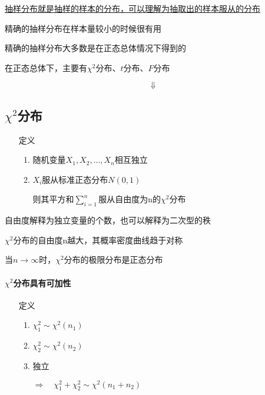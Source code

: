 \documentclass[UTF8,10pt]{book}
\begin{document}
            \underline{抽样分布就是抽样的样本的分布，可以理解为抽取出的样本服从的分布}

            {\kaishu 精确的抽样分布在样本量较小的时候很有用}

            {\kaishu 精确的抽样分布大多数是在正态总体情况下得到的}

            {\kaishu 在正态总体下，主要有$\chi^2$分布、$t$分布、$F$分布}

            $$  \Downarrow $$

        \subsection{$\chi^2$分布}
           
            \begin{itemize}
                \item [定义] {
                    \begin{enumerate}
                        \item 随机变量$X_1,X_2,...,X_n$相互独立
                        \item $X_i$服从标准正态分布$N(0,1)$
                        
                        则其平方和$\sum_{i=1}^n$服从自由度为n的$\chi^2$分布
                    \end{enumerate}
                }
            \end{itemize}
            

            {\kaishu 自由度解释为独立变量的个数，也可以解释为二次型的秩}

            {\kaishu $\chi^2$分布的自由度n越大，其概率密度曲线趋于对称}

            {\kaishu 当$n\to \infty $时，$\chi^2$分布的极限分布是正态分布}

            \paragraph{$\chi^2$分布具有可加性}  
            \begin{itemize}
                \item [定义] {
                    \begin{enumerate}
                        \item $\chi_1^2 \sim \chi^2(n_1)$
                        \item $\chi_2^2 \sim \chi^2(n_2)$
                        \item 独立
                       
                        $\Rightarrow \quad \chi_1^2 + \chi_2^2 \sim \chi^2(n_1 + n_2)$ 
                    \end{enumerate}
                }
            \end{itemize}
\end{document}
